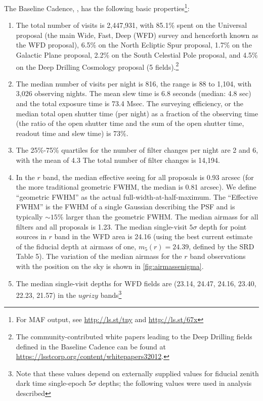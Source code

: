 The Baseline Cadence,
, has the following basic
properties\footnote{For MAF output, see \url{http://ls.st/tny} and
\url{http://ls.st/67x}}:
\begin{enumerate}
\item The total number of visits is 2,447,931, with 85.1\% spent on
the Universal proposal (the main Wide, Fast, Deep (WFD) survey and henceforth
known as the WFD proposal), 6.5\% on the
North Ecliptic Spur proposal, 1.7\% on the Galactic Plane proposal, 2.2\%
on the South Celestial Pole proposal, and 4.5\% on the Deep Drilling
Cosmology proposal (5 fields).\footnote{The community-contributed white papers leading to the
Deep Drilling fields defined in the Baseline Cadence can be found at
\url{https://lsstcorp.org/content/whitepapers32012}.}
\item The median number of visits per night is 816, the range is
88 to 1,104, with 3,026 observing nights. The mean slew time is 6.8
seconds (median: 4.8 sec) and the total exposure time is 73.4 Msec.
The surveying efficiency, or the median total open shutter time (per night)
as a fraction of the observing time (the ratio of the open shutter time and
the sum of the open shutter time, readout time and slew time) is 73\%.
\item
The 25\%-75\% quartiles for the number of filter changes per night are 2
and 6, with the mean of 4.3 The total number of filter changes is 14,194.
\item In the $r$ band, the median effective seeing for all proposals is 0.93 arcsec (for the more
traditional geometric FWHM, the median is 0.81 arcsec).  We define ``geometric FWHM'' as the actual full-width-at-half-maximum.  The ``Effective FWHM'' is the FWHM of a single Gaussian describing the PSF and is typically $\sim15$\% larger than the geometric FWHM. The median
airmass for all filters and all proposals is 1.23. The median single-visit $5\sigma$ depth for point sources in $r$ band in the WFD area is 24.16 (using the best
current estimate of the fiducial depth at airmass of one, $m_5(r)=24.39$,
defined by the SRD Table 5). The variation of the median airmass for the $r$
band observations with the position on the sky is shown in
\autoref{fig:airmassenigma}.
\item The median single-visit depths for WFD fields are (23.14, 24.47, 24.16,
23.40, 22.23, 21.57) in the $ugrizy$ bands\footnote{Note that these values
depend on externally supplied values for fiducial zenith dark time single-epoch
$5\sigma$ depths; the following values were used in analysis described
}
\end{enumerate}
